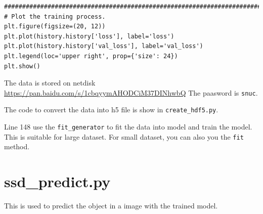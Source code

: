 \begin{lstlisting}
########################################################################################################################
# Plot the training process.
plt.figure(figsize=(20, 12))
plt.plot(history.history['loss'], label='loss')
plt.plot(history.history['val_loss'], label='val_loss')
plt.legend(loc='upper right', prop={'size': 24})
plt.show()
\end{lstlisting}

The data is stored on netdisk \url{https://pan.baidu.com/s/1cbqyymAHODCiM37DINhwbQ}
The paasword is \verb|snuc|.


The code to convert the data into h5 file is show in \verb|create_hdf5.py|.


Line 148 use the \verb|fit_generator| to fit the data into model and train the model.
This is suitable for large dataset.
For small dataset, you can also you the \verb|fit| method.

\section{ssd\_predict.py}

This is used to predict the object in a image with the trained model.
